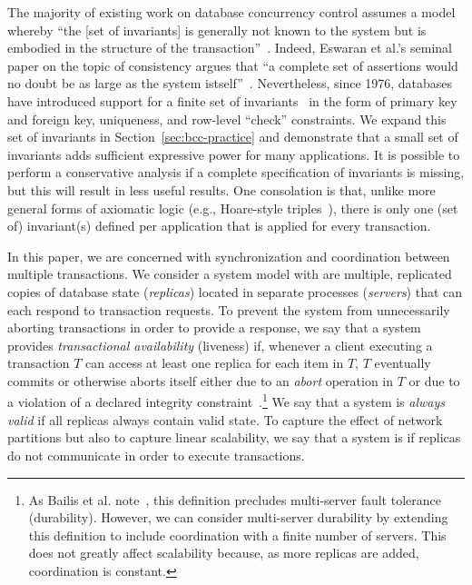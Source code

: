  The majority of existing work
on database concurrency control assumes a model whereby ``the [set of
  invariants] is generally not known to the system but is embodied in
the structure of the transaction''~\cite{traiger-tods}. Indeed,
Eswaran et al.'s seminal paper on the topic of consistency argues that
``a complete set of assertions would no doubt be as large as the
system istself''~\cite{eswaran-consistency}. Nevertheless, since 1976,
databases have introduced support for a finite set of
invariants~\cite{korth-serializability} in the form of primary key and
foreign key, uniqueness, and row-level ``check'' constraints. We
expand this set of invariants in Section~\ref{sec:bcc-practice} and
demonstrate that a small set of invariants adds sufficient expressive
power for many applications. It is possible to perform a conservative
analysis if a complete specification of invariants is missing, but
this will result in less useful results. One consolation is that,
unlike more general forms of axiomatic logic (e.g., Hoare-style
triples~\cite{decomp-semantics}), there is only one (set of)
invariant(s) defined per application that is applied for every
transaction.\vspace{.5em}

 In this paper, we are concerned with
synchronization and coordination between multiple transactions. We
consider a system model with are multiple, replicated copies of
database state (\textit{replicas}) located in separate processes
(\textit{servers}) that can each respond to transaction requests.  To
prevent the system from unnecessarily aborting transactions in order
to provide a response, we say that a system provides
\textit{transactional availability} (liveness) if, whenever a client
executing a transaction $T$ can access at least one replica for each
item in $T$, $T$ eventually commits or otherwise aborts itself either
due to an \textit{abort} operation in $T$ or due to a violation of a
declared integrity constraint~\cite{hat-vldb}.\footnote{As Bailis et
  al. note~\cite{hat-vldb}, this definition precludes multi-server
  fault tolerance (durability). However, we can consider multi-server
  durability by extending this definition to include coordination with
  a finite number of servers. This does not greatly affect scalability
  because, as more replicas are added, coordination is constant.} We
say that a system is \textit{always valid} if all replicas always
contain valid state. To capture the effect of network partitions but
also to capture linear scalability, we say that a system is
\textit{\cfree} if replicas do not communicate in order to execute
transactions.

